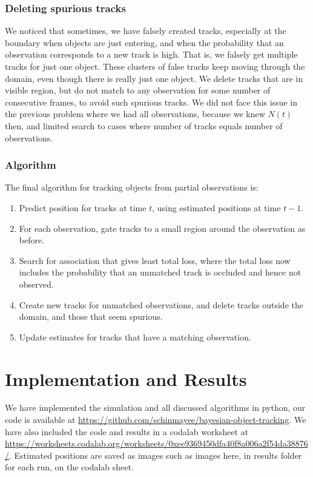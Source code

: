 \documentclass[a4paper]{article}
\begin{document}
\subsubsection{Deleting spurious tracks}
We noticed that sometimes, we have falsely created tracks, especially at the boundary
when objects are just entering, and when the probability that an observation corresponds
to a new track is high. That is, we falsely get multiple tracks for just one object.
These clusters of false tracks keep moving through the domain, even though there is really
just one object.
We delete tracks that are in visible region, but do not match to any observation for some
number of consecutive frames, to avoid such spurious tracks.
We did not face this issue in the previous problem where we had all observations, because
we knew $N(t)$ then, and limited search to cases where number of tracks equals number of observations.

\subsubsection{Algorithm}

The final algorithm for tracking objects from partial observations is:
\begin{enumerate}[itemsep=0mm]
\item Predict position for tracks at time $t$, using estimated positions at time $t-1$.
\item For each observation, gate tracks to a small region around the observation as before.
\item Search for association that gives least total loss, where the total loss now includes
the probability that an unmatched track is occluded and hence not observed.
\item Create new tracks for unmatched observations, and delete tracks outside the domain,
and those that seem spurious.
\item Update estimates for tracks that have a matching observation.
\end{enumerate}


\section{Implementation and Results}
We have implemented the simulation and all discussed algorithms in python, our code is
available at \url{https://github.com/schinmayee/bayesian-object-tracking}.
We have also included the code and results in a codalab worksheet at
\url{https://worksheets.codalab.org/worksheets/0xee9369450dfa40f8a006a2f54da38876/}.
Estimated positions are saved as images such as images here, in results
folder for each run, on the codalab sheet.
\end{document}
